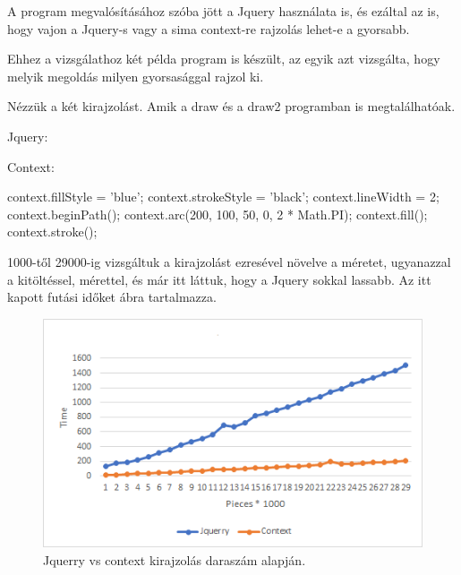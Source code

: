 



A program megvalósításához szóba jött a Jquery használata is, és ezáltal az is, hogy vajon a Jquery-s vagy a sima context-re rajzolás lehet-e a gyorsabb.


Ehhez a vizsgálathoz két példa program is készült, az egyik azt vizsgálta, hogy melyik megoldás milyen gyorsasággal rajzol ki.

Nézzük a két kirajzolást. Amik a draw és a draw2 programban is megtalálhatóak.

Jquery:

Context:

\begin{java}
context.fillStyle = 'blue';
context.strokeStyle = 'black';
context.lineWidth = 2;
context.beginPath();
context.arc(200, 100, 50, 0, 2 * Math.PI);
context.fill();
context.stroke();
	
\end{java}


1000-től 29000-ig vizsgáltuk a kirajzolást ezresével növelve a méretet, ugyanazzal a kitöltéssel, mérettel, és már itt láttuk, hogy a Jquery sokkal lassabb. Az itt kapott futási időket  ábra tartalmazza.

\begin{figure}[h]
	\centering
	\includegraphics[scale=1]{images/pieces.png}
	\caption{Jquerry vs context kirajzolás daraszám alapján.}
	\label{fig:pieces}
\end{figure}



